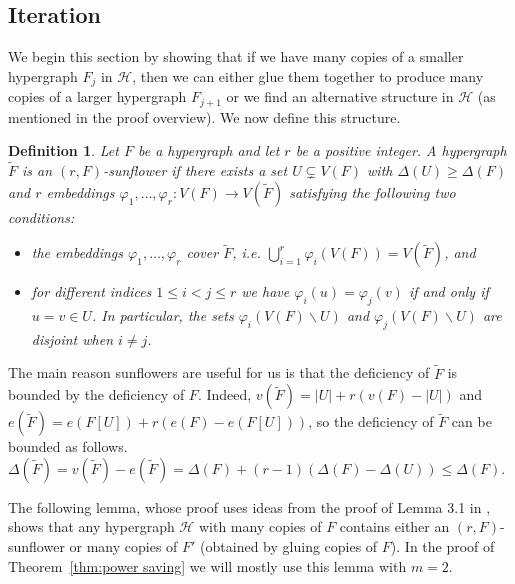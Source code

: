 \documentclass{daj}
\def\cH{\mathcal{H}}
\theoremstyle{plain}
\newtheorem{definition}[theorem]{Definition}
\theoremstyle{remark}
\begin{document}
\subsection{Iteration}\label{subsec:iteration}

We begin this section by showing that if we have many copies of a smaller hypergraph $F_j$ in $\cH$, then we can either glue them together to produce many copies of a larger hypergraph $F_{j+1}$ or  we find an alternative structure in $\cH$ (as mentioned in the proof overview). We now define this structure.

\begin{definition}
Let $F$ be a hypergraph and let $r$ be a positive integer. A hypergraph $\tilde F$ is an \textit{$(r, F)$-sunflower} if there exists a set $U\subsetneq V(F)$ with $\Delta(U)\geq \Delta(F)$ and $r$ embeddings $\varphi_1, \dots, \varphi_r:V(F)\to V(\tilde F)$ satisfying the following two conditions:
\begin{itemize}
    \item[(i)] the embeddings $\varphi_1, \dots, \varphi_r$ cover $\tilde F$, i.e. $\bigcup_{i=1}^r \varphi_i(V(F))=V(\tilde F)$, and 
    \item[(ii)] for different indices $1\leq i<j\leq r$ we have $\varphi_i(u)=\varphi_j(v)$ if and only if $u=v\in U$. In particular, the sets $\varphi_i(V(F)\backslash U)$ and $\varphi_j(V(F)\backslash U)$ are disjoint when $i\neq j$.
\end{itemize}
\end{definition}

The main reason sunflowers are useful for us is that the deficiency of $\tilde F$ is bounded by the deficiency of $F$. Indeed, $v(\tilde F)=|U|+r(v(F)-|U|)$ and $e(\tilde F)=e(F[U])+r(e(F)-e(F[U]))$, so the deficiency of $\tilde F$ can be bounded as follows. $\Delta(\tilde F)=v(\tilde F)-e(\tilde F)=\Delta(F)+(r-1)(\Delta(F)-\Delta(U))\leq \Delta(F)$.

The following lemma, whose proof uses ideas from the proof of Lemma 3.1 in \cite{CGLS23}, shows that any hypergraph $\cH$ with many copies of $F$ contains either an $(r, F)$-sunflower or many copies of $F'$ (obtained by gluing copies of $F$). In the proof of Theorem~\ref{thm:power saving} we will mostly use this lemma with $m=2$.
\end{document}

